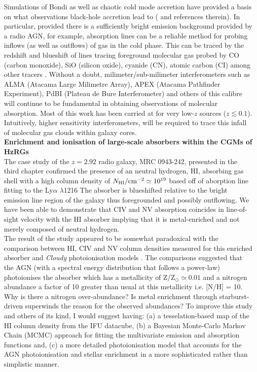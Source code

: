 \documentclass[10pt,a4paper]{article}
\begin{document}
Simulations of Bondi as well as chaotic cold mode accretion have provided a basis on what observations black-hole accretion lead to (\citet{Gaspari2013} and references therein). In particular, provided there is a sufficiently bright emission background provided by a radio AGN, for example, absorption lines can be a reliable method for probing inflows (as well as outflows) of gas in the cold phase. This can be traced by the
redshift and blueshift of lines tracing foreground molecular gas probed by CO (carbon monoxide), SiO (silicon oxide), cyanide (CN), atomic carbon (CI) among other tracers \citep{David2014,Tremblay2016,Ruffa2019,Rose2019}. Without a doubt, milimeter/sub-milimeter interferometers such as ALMA (Atacama Large Milimetre Array), APEX (Atacama Pathfinder Experiment), PdBI (Plateau de Bure Interferometer) and others of this calibre will continue to be fundamental in obtaining observations of molecular absorption. Most of this work has been carried at for very low-$z$ sources ($z \lesssim 0.1$). Intuitively, higher sensitivity interferometers, will be required to trace this infall of molecular gas clouds within galaxy cores. \\

{\bf Enrichment and ionisation of large-scale absorbers within the CGMs of HzRGs}\\

The case study of the $z=2.92$ radio galaxy, MRC 0943-242, presented in the third chapter confirmed the presence of an neutral hydrogen, HI, absorbing gas shell with a high column density of $N_{\rm HI}/\rm{cm}^{-2} \simeq 10^{19}$ based off of aborption line fitting to the Ly$\alpha$ $\lambda$1216 The absorber is blueshifted relative to the bright emission line region of the galaxy thus foregrounded and possibly outflowing. We have been able to demonstrate that CIV and NV absorption coincides in line-of-sight velocity with the HI absorber implying that it is metal-enriched and not merely composed of neutral hydrogen. \\

The result of the study appeared to be somewhat paradoxical with the comparison between HI, CIV and NV column densities measured for this enriched absorber and {\it Cloudy} photoionisation models \citep{Ferland2013}. The comparisons suggested that the AGN (with a spectral energy distribution that follows a power-law) photoionises the absorber which has a metallicity of Z/Z$_\odot \simeq 0.01$ and a nitrogen abundance a factor of 10 greater than usual at this metallicity i.e. [N/H] = 10. Why is there a nitrogen over-abundance? Is metal enrichment through starburst-driven superwinds the reason for the observed abundances? To improve this study and others of its kind, I would suggest having: (a) a tesselation-based map of the HI column density from the IFU datacube, (b) a Bayesian Monte-Carlo Markov Chain (MCMC) approach for fitting the multivariate emission and absorption functions and, (c) a more detailed photoionisation model that accounts for the AGN photoionisation and stellar enrichment in a more sophisticated rather than simplistic manner. \\
\end{document}
